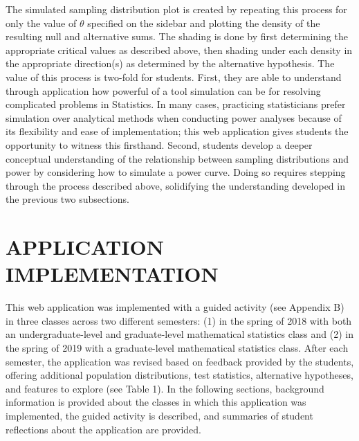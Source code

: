 \documentclass{TISE}
\begin{document}
The simulated sampling distribution plot is created by repeating this process for only the value of $\theta$ specified on the sidebar and plotting the density of the resulting null and alternative sums. The shading is done by first determining the appropriate critical values as described above, then shading under each density in the appropriate direction(s) as determined by the alternative hypothesis. The value of this process is two-fold for students. First, they are able to understand through application how powerful of a tool simulation can be for resolving complicated problems in Statistics. In many cases, practicing statisticians prefer simulation over analytical methods when conducting power analyses because of its flexibility and ease of implementation; this web application gives students the opportunity to witness this firsthand. Second, students develop a deeper conceptual understanding of the relationship between sampling distributions and power by considering how to simulate a power curve. Doing so requires stepping through the process described above, solidifying the understanding developed in the previous two subsections. 

\section{APPLICATION IMPLEMENTATION}

This web application was implemented with a guided activity (see Appendix B) in three classes across two different semesters: (1) in the spring of 2018 with both an undergraduate-level and graduate-level mathematical statistics class and (2) in the spring of 2019 with a graduate-level mathematical statistics class. After each semester, the application was revised based on feedback provided by the students, offering additional population distributions, test statistics, alternative hypotheses, and features to explore (see Table 1). In the following sections, background information is provided about the classes in which this application was implemented, the guided activity is described, and summaries of student reflections about the application are provided. 
\end{document}
